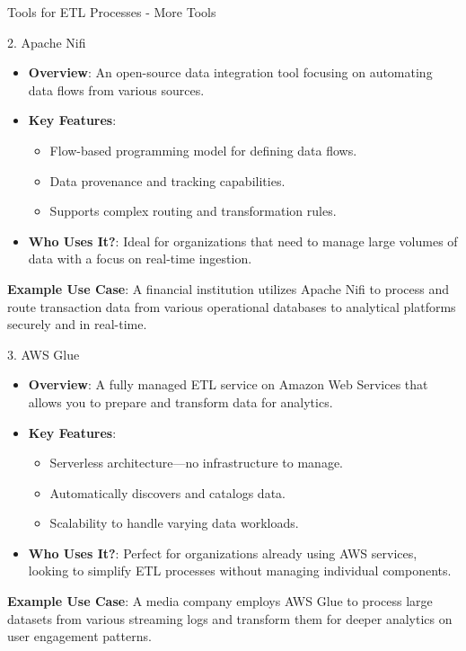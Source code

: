 \documentclass[aspectratio=169]{beamer}
\begin{document}
\begin{frame}[fragile]{Tools for ETL Processes - More Tools}
  \begin{block}{2. Apache Nifi}
    \begin{itemize}
      \item \textbf{Overview}: An open-source data integration tool focusing on automating data flows from various sources.
      \item \textbf{Key Features}:
        \begin{itemize}
          \item Flow-based programming model for defining data flows.
          \item Data provenance and tracking capabilities.
          \item Supports complex routing and transformation rules.
        \end{itemize}
      \item \textbf{Who Uses It?}: Ideal for organizations that need to manage large volumes of data with a focus on real-time ingestion.
    \end{itemize}
    \textbf{Example Use Case}: A financial institution utilizes Apache Nifi to process and route transaction data from various operational databases to analytical platforms securely and in real-time.
  \end{block}

  \begin{block}{3. AWS Glue}
    \begin{itemize}
      \item \textbf{Overview}: A fully managed ETL service on Amazon Web Services that allows you to prepare and transform data for analytics.
      \item \textbf{Key Features}:
        \begin{itemize}
          \item Serverless architecture—no infrastructure to manage.
          \item Automatically discovers and catalogs data.
          \item Scalability to handle varying data workloads.
        \end{itemize}
      \item \textbf{Who Uses It?}: Perfect for organizations already using AWS services, looking to simplify ETL processes without managing individual components.
    \end{itemize}
    \textbf{Example Use Case}: A media company employs AWS Glue to process large datasets from various streaming logs and transform them for deeper analytics on user engagement patterns.
  \end{block}
\end{frame}
\end{document}
